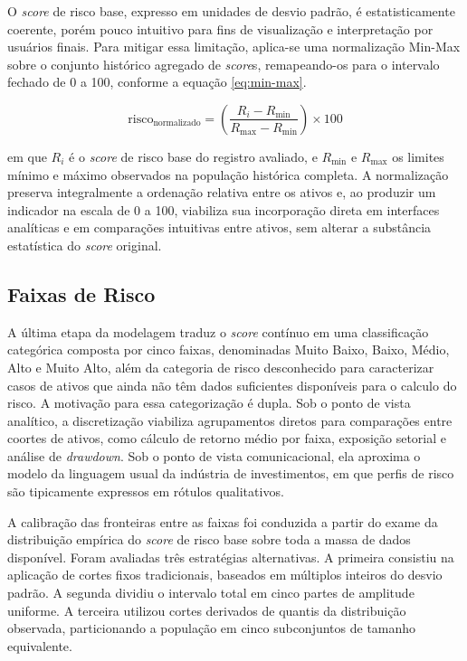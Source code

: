 O \textit{score} de risco base, expresso em unidades de desvio padrão, é estatisticamente coerente, porém pouco intuitivo para fins de visualização e interpretação por usuários finais. Para mitigar essa limitação, aplica-se uma normalização Min-Max sobre o conjunto histórico agregado de \textit{score}s, remapeando-os para o intervalo fechado de 0 a 100, conforme a equação \ref{eq:min-max}.

\begin{equation}
\label{eq:min-max}
\text{risco}_{\text{normalizado}} = \left( \frac{R_i - R_{\min}}{R_{\max} - R_{\min}} \right) \times 100
\end{equation}

\noindent em que \(R_i\) é o \textit{score} de risco base do registro avaliado, e \(R_{\min}\) e \(R_{\max}\) os limites mínimo e máximo observados na população histórica completa. A normalização preserva integralmente a ordenação relativa entre os ativos e, ao produzir um indicador na escala de 0 a 100, viabiliza sua incorporação direta em interfaces analíticas e em comparações intuitivas entre ativos, sem alterar a substância estatística do \textit{score} original.

\subsection{Faixas de Risco}
\label{subsec:faixas-risco}

A última etapa da modelagem traduz o \textit{score} contínuo em uma classificação categórica composta por cinco faixas, denominadas Muito Baixo, Baixo, Médio, Alto e Muito Alto, além da categoria de risco desconhecido para caracterizar casos de ativos que ainda não têm dados suficientes disponíveis para o calculo do risco. A motivação para essa categorização é dupla. Sob o ponto de vista analítico, a discretização viabiliza agrupamentos diretos para comparações entre coortes de ativos, como cálculo de retorno médio por faixa, exposição setorial e análise de \textit{drawdown}. Sob o ponto de vista comunicacional, ela aproxima o modelo da linguagem usual da indústria de investimentos, em que perfis de risco são tipicamente expressos em rótulos qualitativos.

A calibração das fronteiras entre as faixas foi conduzida a partir do exame da distribuição empírica do \textit{score} de risco base sobre toda a massa de dados disponível. Foram avaliadas três estratégias alternativas. A primeira consistiu na aplicação de cortes fixos tradicionais, baseados em múltiplos inteiros do desvio padrão. A segunda dividiu o intervalo total em cinco partes de amplitude uniforme. A terceira utilizou cortes derivados de quantis da distribuição observada, particionando a população em cinco subconjuntos de tamanho equivalente.

